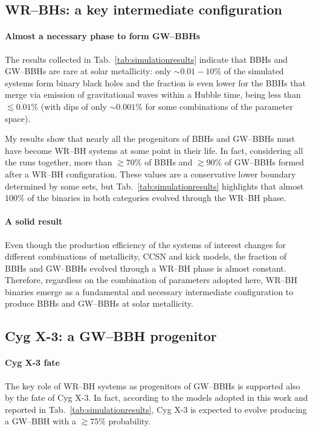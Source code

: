 \documentclass[a4paper,titlepage]{book}     	%
\begin{document}
\subsection{WR--BHs: a key intermediate configuration} 
\paragraph{Almost a necessary phase to form GW--BBHs} The results collected in Tab.\ \ref{tab:simulationresults} indicate that BBHs and GW--BBHs are rare at solar metallicity: only $\sim 0.01 - 10$\% of the simulated systems form binary black holes and the fraction is even lower for the BBHs that merge via emission of gravitational waves within a Hubble time, being less than $\lesssim 0.01$\% (with dips of only $\sim 0.001$\% for some combinations of the parameter space). 

My results show that nearly all the progenitors of BBHs and GW--BBHs must have become WR--BH systems at some point in their life. In fact, considering all the runs together, more than $\gtrsim 70\%$ of BBHs and $\gtrsim 90\%$ of GW--BBHs formed after a WR--BH configuration. These values are a conservative lower boundary determined by some sets, but Tab.\ \ref{tab:simulationresults} highlights that almost 100\% of the binaries in both categories evolved through the WR--BH phase.

\paragraph{A solid result} Even though the production efficiency of the systems of interest changes for different combinations of metallicity, CCSN and kick models, the fraction of BBHs and GW--BBHs evolved through a WR--BH phase is almost constant. Therefore, regardless on the combination of parameters adopted here, WR--BH binaries emerge as a fundamental and necessary intermediate configuration to produce BBHs and GW--BBHs at solar metallicity.

\subsection{Cyg X-3: a GW--BBH progenitor}
\paragraph{Cyg X-3 fate} The key role of WR--BH systems as progenitors of GW--BBHs is supported also by the fate of Cyg X-3. In fact, according to the models adopted in this work and reported in Tab.\ \ref{tab:simulationresults}, Cyg X-3 is expected to evolve producing a GW--BBH with a $\gtrsim 75 \%$ probability. 
\end{document}
